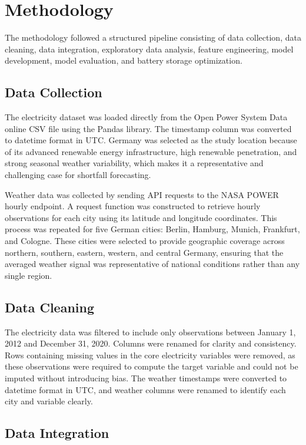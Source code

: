 \documentclass[conference]{IEEEtran}
\begin{document}
\section{Methodology}
 
The methodology followed a structured pipeline consisting of data collection, data cleaning, data integration, exploratory data analysis, feature engineering, model development, model evaluation, and battery storage optimization.
 
\subsection{Data Collection}
 
The electricity dataset was loaded directly from the Open Power System Data online CSV file using the Pandas library. The timestamp column was converted to datetime format in UTC. Germany was selected as the study location because of its advanced renewable energy infrastructure, high renewable penetration, and strong seasonal weather variability, which makes it a representative and challenging case for shortfall forecasting.
 
Weather data was collected by sending API requests to the NASA POWER hourly endpoint. A request function was constructed to retrieve hourly observations for each city using its latitude and longitude coordinates. This process was repeated for five German cities: Berlin, Hamburg, Munich, Frankfurt, and Cologne. These cities were selected to provide geographic coverage across northern, southern, eastern, western, and central Germany, ensuring that the averaged weather signal was representative of national conditions rather than any single region.
 
\subsection{Data Cleaning}
 
The electricity data was filtered to include only observations between January 1, 2012 and December 31, 2020. Columns were renamed for clarity and consistency. Rows containing missing values in the core electricity variables were removed, as these observations were required to compute the target variable and could not be imputed without introducing bias. The weather timestamps were converted to datetime format in UTC, and weather columns were renamed to identify each city and variable clearly.
 
\subsection{Data Integration}
 
\end{document}
